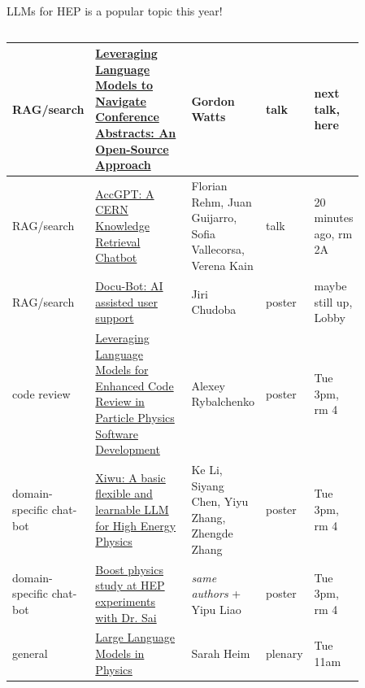 \documentclass[aspectratio=169]{beamer}
\begin{document}
\begin{frame}{LLMs for HEP is a popular topic this year!}
\small
\vspace{0.25 cm}
\begin{columns}
\renewcommand{\arraystretch}{1.04}
\begin{tabular}{C{0.15\linewidth} L{0.34\linewidth} L{0.18\linewidth} C{0.07\linewidth} C{0.12\linewidth}}
RAG/search & \textcolor{blue}{\href{https://indico.cern.ch/event/1338689/contributions/6011147/}{Leveraging Language Models to Navigate Conference Abstracts: An Open-Source Approach}} & Gordon Watts & talk & next talk, here \\\hline
RAG/search & \textcolor{blue}{\href{https://indico.cern.ch/event/1338689/contributions/6010661/}{AccGPT: A CERN Knowledge Retrieval Chatbot}} & Florian Rehm, Juan Guijarro, Sofia Vallecorsa, Verena Kain & talk & 20 minutes ago, rm 2A \\\hline
RAG/search & \textcolor{blue}{\href{https://indico.cern.ch/event/1338689/contributions/6010735/}{Docu-Bot: AI assisted user support}} & Jiri Chudoba & poster & maybe still up, Lobby \\\hline
code review & \textcolor{blue}{\href{https://indico.cern.ch/event/1338689/contributions/6010676/}{Leveraging Language Models for Enhanced Code Review in Particle Physics Software Development}} & Alexey Rybalchenko & poster & Tue 3pm, rm 4 \\\hline
domain-specific chat-bot & \textcolor{blue}{\href{https://indico.cern.ch/event/1338689/contributions/6010731/}{Xiwu: A basic flexible and learnable LLM for High Energy Physics}} & Ke Li, Siyang Chen, Yiyu Zhang, Zhengde Zhang & poster & Tue 3pm, rm 4 \\\hline
domain-specific chat-bot & \textcolor{blue}{\href{https://indico.cern.ch/event/1338689/contributions/6010732/}{Boost physics study at HEP experiments with Dr. Sai}} & {\it same authors} + Yipu Liao & poster & Tue 3pm, rm 4 \\\hline
general & \textcolor{blue}{\href{https://indico.cern.ch/event/1338689/contributions/6066662/}{Large Language Models in Physics}} & Sarah Heim & plenary & Tue 11am \\
\end{tabular}
\end{columns}
\end{frame}
\end{document}
